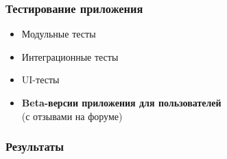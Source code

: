 \documentclass[xetex,t]{beamer}
\begin{document}
%
%
\begin{frame}
  \frametitle{Тестирование приложения}
  {
    \Large
    \begin{itemize}
      \item Модульные тесты
      \item Интеграционные тесты
      \item UI-тесты
    \end{itemize}
    
    \begin{itemize}
     \item \textbf{Beta-версии приложения для пользователей} \\ (с отзывами на форуме)
    \end{itemize}
  }
\end{frame}


%
%
\begin{frame}
  \frametitle{Результаты}
\end{frame}


%
%
\begin{frame}[c]
\begin{center}
  \Huge\bfseries
  \color{ifmoblue}{Спасибо за внимание}
\end{center}
\end{frame}
\end{document}
